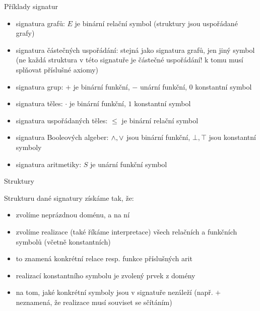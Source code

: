 \documentclass{beamer}
\begin{document}
\begin{frame}{Příklady signatur}

    \begin{itemize}
        \item {} signatura \alert{grafů}: $E$ je binární relační symbol (struktury jsou uspořádané grafy)\pause
        \item \myexampleinline{
        $\langle \leq \rangle$
        } signatura \alert{částečných uspořádání}: stejná jako signatura grafů, jen jiný symbol \pause (ne každá struktura v této signatuře je částečné uspořádání! k tomu musí splňovat příslušné \alert{axiomy})\pause
        \item \myexampleinline{
        $\langle +, -, 0\rangle$
        } signatura \alert{grup}: $+$ je binární funkční, $-$ unární funkční, $0$ konstantní symbol\pause
        \item {} signatura \alert{těles}: $\cdot$ je binární funkční, $1$ konstantní symbol\pause
        \item {} signatura \alert{uspořádaných těles}: $\leq$ je binární relační symbol\pause
        \item \myexampleinline{
        $\langle -,\landsymb,\lorsymb,\bot,\top\rangle$
        } signatura \alert{Booleových algeber}: ${\land},{\lor}$ jsou binární funkční, $\bot,\top$ jsou konstantní symboly\pause
        \item {} signatura \alert{aritmetiky}: $S$ je unární funkční symbol
    \end{itemize}
    
\end{frame}


\begin{frame}{Struktury}

    \alert{Strukturu} dané signatury získáme tak, že: \pause
    \begin{itemize}
        \item zvolíme neprázdnou \alert{doménu}, a na ní \pause
        \item zvolíme \alert{realizace} (také říkáme \alert{interpretace}) všech relačních a funkčních symbolů (včetně konstantních) \pause
        \item to znamená \alert{konkrétní} relace resp. funkce příslušných arit \pause
        \item realizací konstantního symbolu je zvolený prvek z domény \pause
        \item na tom, jaké konkrétní symboly jsou v signatuře nezáleží \pause (např. $+$ neznamená, že realizace musí souviset se sčítáním)
    \end{itemize}

\end{frame}
\end{document}
